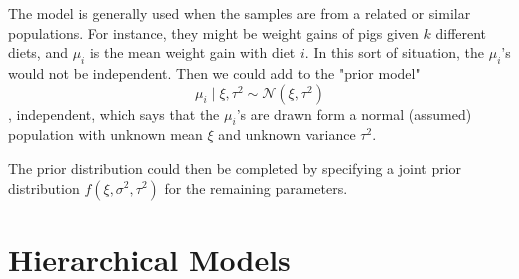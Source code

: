 \documentclass[lecture,12pt,]{pcms-l}
\numberwithin{section}{chapter}
\numberwithin{equation}{chapter}
\theoremstyle{plain}
\theoremstyle{definition}
\theoremstyle{definition}
\begin{document}
The model is generally used when the samples are from a related or similar populations. For instance, they might be weight gains of pigs given $k$ different diets, and $\mu_i$ is the mean weight gain with diet $i$. In this sort of situation, the $\mu_i$'s would not be independent. Then we could add to the "prior model"
\begin{equation}
\mu_i \mid \xi, \tau^2 \sim \mathcal{N}(\xi, \tau^2)
\end{equation}
, independent, which says that the $\mu_i$'s are drawn form a normal (assumed) population with unknown mean $\xi$ and unknown variance $\tau^2$.

The prior distribution could then be completed by specifying a joint prior distribution $f(\xi, \sigma^2, \tau^2)$ for the remaining parameters.

\section{Hierarchical Models}
\end{document}
